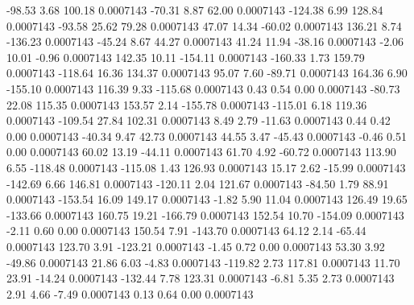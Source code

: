       -98.53        3.68      100.18     0.0007143
      -70.31        8.87       62.00     0.0007143
     -124.38        6.99      128.84     0.0007143
      -93.58       25.62       79.28     0.0007143
       47.07       14.34      -60.02     0.0007143
      136.21        8.74     -136.23     0.0007143
      -45.24        8.67       44.27     0.0007143
       41.24       11.94      -38.16     0.0007143
       -2.06       10.01       -0.96     0.0007143
      142.35       10.11     -154.11     0.0007143
     -160.33        1.73      159.79     0.0007143
     -118.64       16.36      134.37     0.0007143
       95.07        7.60      -89.71     0.0007143
      164.36        6.90     -155.10     0.0007143
      116.39        9.33     -115.68     0.0007143
        0.43        0.54        0.00     0.0007143
      -80.73       22.08      115.35     0.0007143
      153.57        2.14     -155.78     0.0007143
     -115.01        6.18      119.36     0.0007143
     -109.54       27.84      102.31     0.0007143
        8.49        2.79      -11.63     0.0007143
        0.44        0.42        0.00     0.0007143
      -40.34        9.47       42.73     0.0007143
       44.55        3.47      -45.43     0.0007143
       -0.46        0.51        0.00     0.0007143
       60.02       13.19      -44.11     0.0007143
       61.70        4.92      -60.72     0.0007143
      113.90        6.55     -118.48     0.0007143
     -115.08        1.43      126.93     0.0007143
       15.17        2.62      -15.99     0.0007143
     -142.69        6.66      146.81     0.0007143
     -120.11        2.04      121.67     0.0007143
      -84.50        1.79       88.91     0.0007143
     -153.54       16.09      149.17     0.0007143
       -1.82        5.90       11.04     0.0007143
      126.49       19.65     -133.66     0.0007143
      160.75       19.21     -166.79     0.0007143
      152.54       10.70     -154.09     0.0007143
       -2.11        0.60        0.00     0.0007143
      150.54        7.91     -143.70     0.0007143
       64.12        2.14      -65.44     0.0007143
      123.70        3.91     -123.21     0.0007143
       -1.45        0.72        0.00     0.0007143
       53.30        3.92      -49.86     0.0007143
       21.86        6.03       -4.83     0.0007143
     -119.82        2.73      117.81     0.0007143
       11.70       23.91      -14.24     0.0007143
     -132.44        7.78      123.31     0.0007143
       -6.81        5.35        2.73     0.0007143
        2.91        4.66       -7.49     0.0007143
        0.13        0.64        0.00     0.0007143
